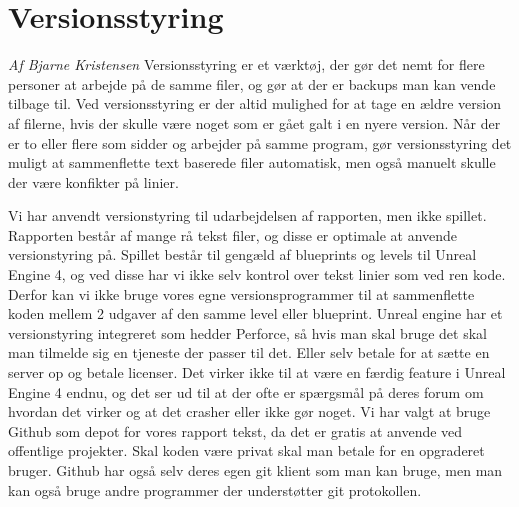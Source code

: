 \section{Versionsstyring}
\textit{Af Bjarne Kristensen}\newline
Versionsstyring er et værktøj, der gør det nemt for flere personer at arbejde på de samme filer, og gør at der er backups man kan vende tilbage til. Ved versionsstyring er der altid mulighed for at tage en ældre version af filerne, hvis der skulle være
noget som er gået galt i en nyere version. Når der er to eller flere som sidder og arbejder på samme program, gør versionsstyring det muligt at sammenflette text baserede filer automatisk, men også manuelt skulle der være konfikter på linier.

Vi har anvendt versionstyring til udarbejdelsen af rapporten, men ikke spillet. Rapporten består af mange rå tekst filer, og disse er optimale at anvende versionstyring på. Spillet består til gengæld af blueprints og levels til Unreal Engine 4, og ved disse har vi ikke selv kontrol over tekst linier som ved ren kode. Derfor kan vi ikke bruge vores egne versionsprogrammer til at sammenflette koden mellem 2 udgaver af den samme level eller blueprint. Unreal engine har et versionstyring integreret som hedder Perforce, så hvis man skal bruge det skal man tilmelde sig en tjeneste der passer til det. Eller selv betale for at sætte en server op og betale licenser. Det virker ikke til at være en færdig feature i Unreal Engine 4 endnu, og det ser ud til at der ofte er spærgsmål på deres forum om hvordan det virker og at det crasher eller ikke gør noget\cite{blueprintmerge}.
Vi har valgt at bruge Github som depot for vores rapport tekst, da det er gratis at anvende ved offentlige projekter. Skal koden være privat skal man betale for en opgraderet bruger\cite{githubterms}. Github har også selv deres egen git klient som man kan bruge, men man kan også bruge andre programmer der understøtter git protokollen.